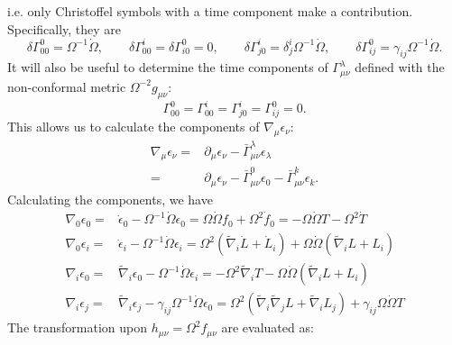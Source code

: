 \documentclass[10pt,letterpaper]{article}
\numberwithin{equation}{subsection}
\begin{document}
i.e. only Christoffel symbols with a time component make a contribution. Specifically, they are 
\begin{equation}
\delta \Gamma^0_{00} = \Omega^{-1}\dot\Omega ,\qquad \delta \Gamma^i_{00} = \delta \Gamma^0_{i0} =0,\qquad \delta \Gamma^i_{j0} = \delta^{i}_j
\Omega^{-1} \dot \Omega,\qquad \delta \Gamma^0_{ij} = \gamma_{ij} \Omega^{-1}\dot \Omega.
\end{equation}
It will also be useful to determine the time components of $\Gamma^\lambda_{\mu\nu}$ defined with the non-conformal metric $\Omega^{-2}g_{\mu\nu}$:
\begin{equation}
\Gamma^{0}_{00} = \Gamma^{i}_{00} = \Gamma^{i}_{j0} = \Gamma^0_{ij}=0.
\end{equation}
This allows us to calculate the components of $\nabla_\mu \epsilon_\nu$:
\begin{align}
\nabla_\mu \epsilon_\nu ={}& \partial_\mu \epsilon_\nu - \bar \Gamma^\lambda_{\mu\nu} \epsilon_\lambda
\nonumber\\
={}& \partial_\mu \epsilon_\nu - \bar \Gamma^0_{\mu\nu} \epsilon_0 - \bar \Gamma^k_{\mu\nu} \epsilon_k.
\end{align}
Calculating the components, we have
\begin{align}
\nabla_0 \epsilon_0 ={}& \dot \epsilon_0 - \Omega^{-1}\dot\Omega \epsilon_0 = \Omega \dot \Omega f_0 + \Omega^2 \dot f_0 = -\Omega \dot \Omega T - \Omega^2 \dot T
\nonumber\\
\nabla_0 \epsilon_i ={}& \dot \epsilon_i - \Omega^{-1} \dot \Omega \epsilon_i = \Omega^2 (\tilde\nabla_i \dot L + \dot L_i) + \Omega \dot\Omega (\tilde \nabla_i L + L_i)
\nonumber\\
\nabla_i \epsilon_0 ={}& \tilde\nabla_i \epsilon_0 - \Omega^{-1}\dot\Omega \epsilon_i = -\Omega^2 \tilde\nabla_i T - \Omega \dot\Omega(\tilde\nabla_i L + L_i)
\nonumber\\
\nabla_i \epsilon_j ={}& \tilde\nabla_i \epsilon_j -\gamma_{ij} \Omega^{-1}\dot\Omega \epsilon_0 = \Omega^2(\tilde\nabla_i\tilde\nabla_j L + \tilde\nabla_i L_j)
+\gamma_{ij}\Omega\dot\Omega T
\end{align}
The transformation upon $h_{\mu\nu} = \Omega^2 f_{\mu\nu}$ are evaluated as:
\end{document}
